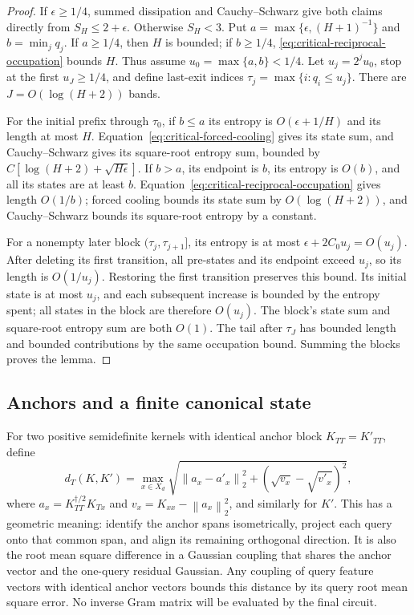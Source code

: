 \documentclass[11pt]{article}
\theoremstyle{remark}
\newcommand{\norm}[1]{\left\lVert #1\right\rVert}
\begin{document}
\begin{proof}
If $\epsilon\ge1/4$, summed dissipation and Cauchy--Schwarz give
both claims directly from $S_H\le2+\epsilon$. Otherwise $S_H<3$.
Put $a=\max\{\epsilon,(H+1)^{-1}\}$ and $b=\min_j q_j$.
If $a\ge1/4$, then $H$ is bounded; if $b\ge1/4$,
\eqref{eq:critical-reciprocal-occupation} bounds $H$. Thus assume
$u_0=\max\{a,b\}<1/4$. Let $u_j=2^ju_0$, stop at the first
$u_J\ge1/4$, and define last-exit indices
$\tau_j=\max\{i:q_i\le u_j\}$. There are
$J=O(\log(H+2))$ bands.

For the initial prefix through $\tau_0$, if $b\le a$ its entropy
is $O(\epsilon+1/H)$ and its length at most $H$.
Equation~\eqref{eq:critical-forced-cooling} gives its state sum,
and Cauchy--Schwarz gives its square-root entropy sum, bounded by
$C[\log(H+2)+\sqrt{H\epsilon}]$. If $b>a$, its endpoint is $b$,
its entropy is $O(b)$, and all its states are at least $b$.
Equation~\eqref{eq:critical-reciprocal-occupation} gives length
$O(1/b)$; forced cooling bounds its state sum by $O(\log(H+2))$,
and Cauchy--Schwarz bounds its square-root entropy by a constant.

For a nonempty later block $(\tau_j,\tau_{j+1}]$, its entropy is
at most $\epsilon+2C_0u_j=O(u_j)$. After deleting its first
transition, all pre-states and its endpoint exceed $u_j$, so its
length is $O(1/u_j)$. Restoring the first transition preserves this
bound. Its initial state is at most $u_j$, and each subsequent
increase is bounded by the entropy spent; all states in the block
are therefore $O(u_j)$. The block's state sum and square-root
entropy sum are both $O(1)$. The tail after $\tau_J$ has bounded
length and bounded contributions by the same occupation bound.
Summing the blocks proves the lemma.
\end{proof}

\subsection{Anchors and a finite canonical state}

For two positive semidefinite kernels with identical anchor block
$K_{TT}=K'_{TT}$, define
\[
 d_T(K,K')=\max_{x\in X_d}
 \sqrt{\norm{a_x-a'_x}_2^2+(\sqrt{v_x}-\sqrt{v'_x})^2},
\]
where $a_x=K_{TT}^{\dagger/2}K_{Tx}$ and
$v_x=K_{xx}-\norm{a_x}_2^2$, and similarly for $K'$.
This has a geometric meaning: identify the anchor spans isometrically,
project each query onto that common span, and align its remaining
orthogonal direction. It is also the root mean square difference in
a Gaussian coupling that shares the anchor vector and the one-query
residual Gaussian. Any coupling of query feature vectors with identical
anchor vectors bounds this distance by its query root mean square
error. No inverse Gram matrix will be evaluated by the final circuit.
\end{document}
